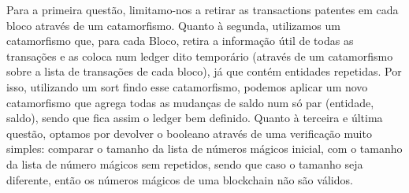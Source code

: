 \documentclass[a4paper]{article}
\begin{document}
Para a primeira questão, limitamo-nos a retirar as transactions patentes em cada bloco
através de um catamorfismo.
Quanto à segunda, utilizamos um catamorfismo que, para cada Bloco, retira a informação
útil de todas as transações e as coloca num ledger dito temporário (através de um catamorfismo sobre
a lista de transações de cada bloco), já que contém
entidades repetidas. Por isso, utilizando um sort findo esse catamorfismo, podemos aplicar
um novo catamorfismo que agrega todas as mudanças de saldo num só par (entidade, saldo), sendo
que fica assim o ledger bem definido.
Quanto à terceira e última questão, optamos por devolver o booleano através de uma
verificação muito simples: comparar o tamanho da lista de números mágicos inicial,
com o tamanho da lista de número mágicos sem repetidos, sendo que caso o tamanho seja
diferente, então os números mágicos de uma blockchain não são válidos.
\end{document}

